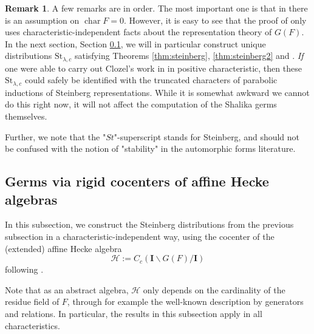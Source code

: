 \documentclass{amsart}
\numberwithin{equation}{section}
\theoremstyle{definition}
\newtheorem{remark}[lemma]{Remark}%
\newcommand{\cH}{\mathcal{H}}
\newcommand{\bI}{\mathbf{I}}
\newcommand{\St}{\mathrm{St}}
\DeclareMathOperator{\cchar}{\text{char}}
\begin{document}
\begin{remark}
A few remarks are in order. 
The most important one is that in \cite{W1,W2} there is an assumption on $\cchar F=0$. However, it is easy to see that the proof of \cite[Proposition 2.4.]{W1} only uses characteristic-independent facts about the representation theory of $G(F)$. In the next section, Section \ref{sec:germsAHA}, we will in particular construct unique distributions $\St_{\lambda,c}$
satisfying Theorems \ref{thm:steinberg}, \ref{thm:steinberg2} and \cite[V 11, V12]{W2}. {\em If} one were able to carry out Clozel's work in \cite{C89} in positive characteristic, then these $\St_{\lambda,c}$ could safely be identified with the truncated characters of parabolic inductions of Steinberg representations. While it is somewhat awkward we cannot do this right now, it will not affect the computation of the Shalika germs themselves.

Further, we note that the "$St$"-superscript stands for Steinberg, and should not be confused with the notion of "stability" in the automorphic forms literature.

\end{remark}


\subsection{Germs via rigid cocenters of affine Hecke algebras}
\label{sec:germsAHA}

In this subsection, we construct the Steinberg distributions from the previous subsection in a characteristic-independent way, using the cocenter of the (extended) affine Hecke algebra $$\cH:=C_c(\bI\backslash G(F)/\bI)$$ following \cite{CiHe, HeCocenter}. 

Note that as an abstract algebra, $\cH$ only depends on the cardinality of the residue field of $F$, through for example the well-known description by generators and relations.  In particular, the results in this subsection apply in all characteristics. %
\end{document}
